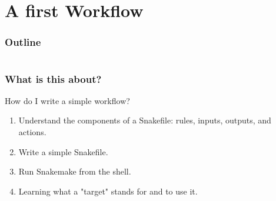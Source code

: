 \section{A first Workflow}

\begin{frame}
    \frametitle{Outline}
    \begin{columns}[t]
        \begin{column}{.5\textwidth}
            \tableofcontents[sections={1-7},currentsection]
        \end{column}
        \begin{column}{.5\textwidth}
            \tableofcontents[sections={8-15},currentsection]
        \end{column}
    \end{columns}
\end{frame}

\begin{frame}
  \frametitle{What is this about?}
   \begin{question}[Questions]
   	 How do I write a simple workflow?
   \end{question}
   \begin{docs}[Objectives]
   	 \begin{enumerate}
                      \item Understand the components of a Snakefile: rules, inputs, outputs, and actions.
                      \item Write a simple Snakefile.
                      \item Run Snakemake from the shell.
                      \item Learning what a "target" stands for and to use it.
     \end{enumerate}
   \end{docs}
\end{frame}

